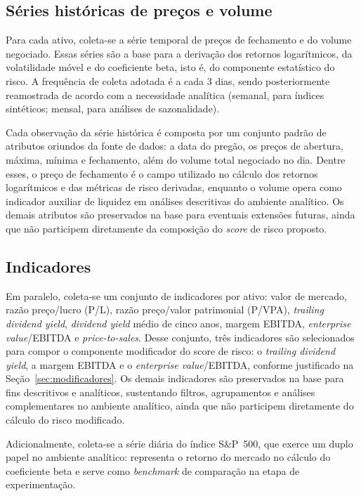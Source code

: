 \subsection{Séries históricas de preços e volume}
Para cada ativo, coleta-se a série temporal de preços de fechamento e do volume negociado. Essas séries são a base para a derivação dos retornos logarítmicos, da volatilidade móvel e do coeficiente beta, isto é, do componente estatístico do risco. A frequência de coleta adotada é a cada 3 dias, sendo posteriormente reamostrada de acordo com a necessidade analítica (semanal, para índices sintéticos; mensal, para análises de sazonalidade).

Cada observação da série histórica é composta por um conjunto padrão de atributos oriundos da fonte de dados: a data do pregão, os preços de abertura, máxima, mínima e fechamento, além do volume total negociado no dia. Dentre esses, o preço de fechamento é o campo utilizado no cálculo dos retornos logarítmicos e das métricas de risco derivadas, enquanto o volume opera como indicador auxiliar de liquidez em análises descritivas do ambiente analítico. Os demais atributos são preservados na base para eventuais extensões futuras, ainda que não participem diretamente da composição do \textit{score} de risco proposto.

\subsection{Indicadores}
Em paralelo, coleta-se um conjunto de indicadores por ativo: valor de mercado, razão preço/lucro (P/L), razão preço/valor patrimonial (P/VPA), \textit{trailing dividend yield}, \textit{dividend yield} médio de cinco anos, margem EBITDA, \textit{enterprise value}/EBITDA e \textit{price-to-sales}. Desse conjunto, três indicadores são selecionados para compor o componente modificador do score de risco: o \textit{trailing dividend yield}, a margem EBITDA e o \textit{enterprise value}/EBITDA, conforme justificado na Seção~\ref{sec:modificadores}. Os demais indicadores são preservados na base para fins descritivos e analíticos, sustentando filtros, agrupamentos e análises complementares no ambiente analítico, ainda que não participem diretamente do cálculo do risco modificado.

Adicionalmente, coleta-se a série diária do índice S\&P~500, que exerce um duplo papel no ambiente analítico: representa o retorno do mercado no cálculo do coeficiente beta e serve como \textit{benchmark} de comparação na etapa de experimentação.

